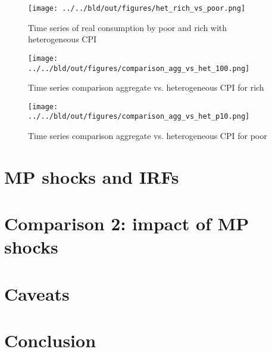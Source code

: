 \documentclass{article}
\begin{document}
\begin{figure}
	\centering
	\texttt{[image: ../../bld/out/figures/het\_rich\_vs\_poor.png]}
	\caption{Time series of real consumption by poor and rich with heterogeneous CPI }
	\label{f2}
\end{figure}

\begin{figure}
	\centering
    \texttt{[image: ../../bld/out/figures/comparison\_agg\_vs\_het\_100.png]}
	\caption{Time series comparison aggregate vs. heterogeneous CPI for rich}
	\label{f3}
\end{figure}

\begin{figure}
	\centering
	\texttt{[image: ../../bld/out/figures/comparison\_agg\_vs\_het\_p10.png]}
	\caption{Time series comparison aggregate vs. heterogeneous CPI for poor}
	\label{f4}
\end{figure}

\section{MP shocks and IRFs}\label{shocks}

\section{Comparison 2: impact of MP shocks}\label{res2}

\section{Caveats}

\section{Conclusion}\label{con}


\newpage
{}


\end{document}
